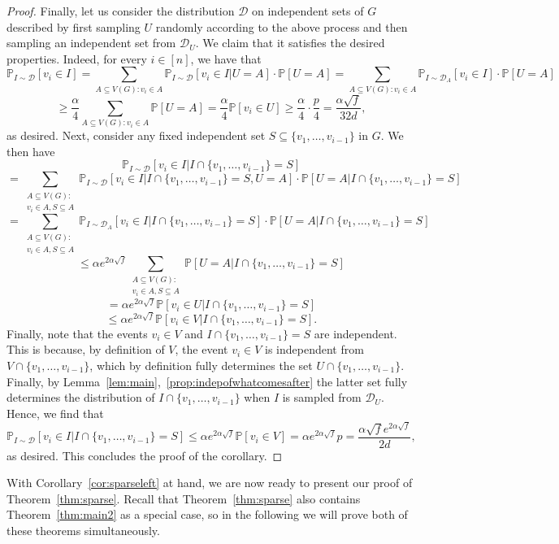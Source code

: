 \documentclass[10pt]{amsart}
\theoremstyle{definition}
\begin{document}
\begin{proof}
    Finally, let us consider the distribution $\mathcal{D}$ on independent sets of $G$ described by first sampling $U$ randomly according to the above process and then sampling an independent set from $\mathcal{D}_U$. We claim that it satisfies the desired properties. Indeed, for every $i\in [n]$, we have that
    $$\mathbb{P}_{I\sim \mathcal{D}}[v_i\in I]=\sum_{A\subseteq V(G):v_i\in A}\mathbb{P}_{I\sim \mathcal{D}}[v_i\in I|U=A]\cdot\mathbb{P}[U=A]=\sum_{A\subseteq V(G):v_i\in A}\mathbb{P}_{I\sim \mathcal{D}_A}[v_i\in I]\cdot\mathbb{P}[U=A]$$
    $$\ge \frac{\alpha}{4}\sum_{A\subseteq V(G): v_i\in A}\mathbb{P}[U=A]=\frac{\alpha}{4}\mathbb{P}[v_i\in U]\ge \frac{\alpha}{4}\cdot \frac{p}{4}=\frac{\alpha\sqrt{f}}{32d},$$ as desired. Next, consider any fixed independent set $S\subseteq \{v_1,\ldots,v_{i-1}\}$ in $G$. 
    We then have
    $$\mathbb{P}_{I\sim \mathcal{D}}[v_i\in I|I\cap \{v_1,\ldots,v_{i-1}\}=S]$$ $$=\sum_{\substack{A\subseteq V(G):\\ v_i\in A, S\subseteq A}}\mathbb{P}_{I\sim \mathcal{D}}[v_i\in I|I\cap \{v_1,\ldots,v_{i-1}\}=S, U=A]\cdot\mathbb{P}[U=A|I\cap \{v_1,\ldots,v_{i-1}\}=S]$$
    $$=\sum_{\substack{A\subseteq V(G):\\ v_i\in A, S\subseteq A}}\mathbb{P}_{I\sim \mathcal{D}_A}[v_i\in I|I\cap \{v_1,\ldots,v_{i-1}\}=S]\cdot\mathbb{P}[U=A|I\cap \{v_1,\ldots,v_{i-1}\}=S]$$
    $$\le \alpha e^{2\alpha\sqrt{f}}\sum_{\substack{A\subseteq V(G):\\ v_i\in A, S\subseteq A}}\mathbb{P}[U=A|I\cap \{v_1,\ldots,v_{i-1}\}=S]$$
    $$=\alpha e^{2\alpha\sqrt{f}} \mathbb{P}[v_i\in U|I\cap \{v_1,\ldots,v_{i-1}\}=S]$$
    $$\le \alpha e^{2\alpha\sqrt{f}} \mathbb{P}[v_i\in V|I\cap \{v_1,\ldots,v_{i-1}\}=S].$$
    Finally, note that the events $v_i\in V$ and $I\cap \{v_1,\ldots,v_{i-1}\}=S$ are independent. This is because, by definition of $V$, the event $v_i\in V$ is independent from $V\cap \{v_1,\ldots,v_{i-1}\}$, which by definition fully determines the set $U\cap \{v_1,\ldots,v_{i-1}\}$. Finally, by Lemma~\ref{lem:main},~\ref{prop:indepofwhatcomesafter} the latter set fully determines the distribution of $I\cap \{v_1,\ldots,v_{i-1}\}$ when $I$ is sampled from $\mathcal{D}_U$. Hence, we find that $$\mathbb{P}_{I\sim \mathcal{D}}[v_i\in I|I\cap\{v_1,\ldots,v_{i-1}\}=S]\le \alpha e^{2\alpha\sqrt{f}}\mathbb{P}[v_i\in V]=\alpha e^{2\alpha\sqrt{f}}p=\frac{\alpha\sqrt{f} e^{2\alpha\sqrt{f}}}{2d},$$ as desired. This concludes the proof of the corollary.
    \end{proof}
With Corollary~\ref{cor:sparseleft} at hand, we are now ready to present our proof of Theorem~\ref{thm:sparse}. Recall that Theorem~\ref{thm:sparse} also contains Theorem~\ref{thm:main2} as a special case, so in the following we will prove both of these theorems simultaneously. 
\end{document}

